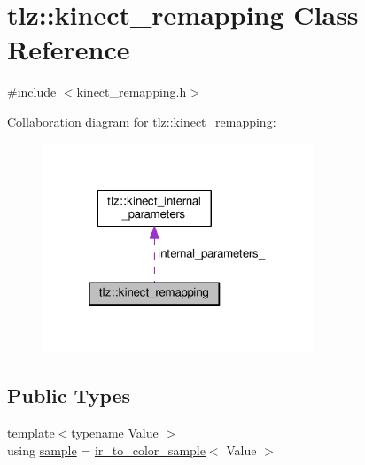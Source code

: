 \hypertarget{classtlz_1_1kinect__remapping}{}\section{tlz\+:\+:kinect\+\_\+remapping Class Reference}
\label{classtlz_1_1kinect__remapping}


{\ttfamily \#include $<$kinect\+\_\+remapping.\+h$>$}



Collaboration diagram for tlz\+:\+:kinect\+\_\+remapping\+:
\nopagebreak
\begin{figure}[H]
\begin{center}
\leavevmode
\includegraphics[width=229pt]{classtlz_1_1kinect__remapping__coll__graph}
\end{center}
\end{figure}
\subsection*{Public Types}
\begin{DoxyCompactItemize}
\item 
{\footnotesize template$<$typename Value $>$ }\\using \hyperlink{classtlz_1_1kinect__remapping_a10367314ff6c1cb5696f087454ec9f7f}{sample} = \hyperlink{structtlz_1_1ir__to__color__sample}{ir\+\_\+to\+\_\+color\+\_\+sample}$<$ Value $>$
\end{DoxyCompactItemize}
